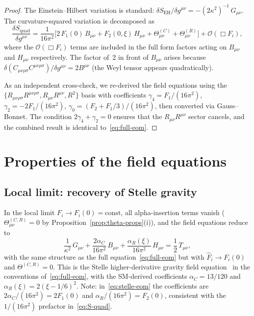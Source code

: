 \documentclass[12pt,a4paper]{article}
\newcommand{\Weylsq}{C_{\mu\nu\rho\sigma}C^{\mu\nu\rho\sigma}}
\newcommand{\Ricsq}{R_{\mu\nu}R^{\mu\nu}}
\newcommand{\Riemsq}{R_{\mu\nu\rho\sigma}R^{\mu\nu\rho\sigma}}
\newcommand{\order}{\mathcal{O}}
\theoremstyle{plain}
\theoremstyle{definition}
\begin{document}
\begin{proof}
The Einstein--Hilbert variation is standard:
$\delta S_{\mathrm{EH}}/\delta g^{\mu\nu}
= -(2\kappa^2)^{-1}\,G_{\mu\nu}$.
The curvature-squared variation is decomposed as
\begin{equation}\label{eq:var-decomp}
  \frac{\delta S_{\mathrm{quad}}}{\delta g^{\mu\nu}}
  = \frac{1}{16\pi^2}\bigl[2\,F_1(0)\,B_{\mu\nu}
    + F_2(0,\xi)\,H_{\mu\nu}
    + \Theta^{(C)}_{\mu\nu} + \Theta^{(R)}_{\mu\nu}\bigr]
    + \order(\Box F_i),
\end{equation}
where the $\order(\Box F_i)$ terms are included in the full form factors
acting on $B_{\mu\nu}$ and $H_{\mu\nu}$ respectively.  The factor of~2 in
front of $B_{\mu\nu}$ arises because $\delta(\Weylsq)/\delta g^{\mu\nu}
= 2B^{\mu\nu}$ (the Weyl tensor appears quadratically).

As an independent cross-check, we re-derived the field equations using the
$\{\Riemsq, \Ricsq, R^2\}$ basis with coefficients
$\gamma_4 = F_1/(16\pi^2)$, $\gamma_2 = -2F_1/(16\pi^2)$,
$\gamma_0 = (F_2 + F_1/3)/(16\pi^2)$, then converted via Gauss--Bonnet.
The condition $2\gamma_4 + \gamma_2 = 0$ ensures that the $\Ricsq$ sector
cancels, and the combined result is identical
to~\eqref{eq:full-eom}.
\end{proof}

\section{Properties of the field equations}
\label{sec:properties}

\subsection{Local limit: recovery of Stelle gravity}
\label{sec:local-limit}

In the local limit $F_i \to F_i(0) = \mathrm{const}$, all alpha-insertion
terms vanish ($\Theta^{(C,R)}_{\mu\nu} = 0$ by
Proposition~\ref{prop:theta-props}(i)), and the field equations reduce to
\begin{equation}\label{eq:stelle-eom}
  \frac{1}{\kappa^2}\,G_{\mu\nu}
  + \frac{2\alpha_C}{16\pi^2}\,B_{\mu\nu}
  + \frac{\alpha_R(\xi)}{16\pi^2}\,H_{\mu\nu}
  = \frac{1}{2}\,T_{\mu\nu},
\end{equation}
with the same structure as the full equation~\eqref{eq:full-eom}
but with $\hat{F}_i \to F_i(0)$ and $\Theta^{(C,R)} = 0$.
This is the Stelle higher-derivative gravity field
equation~\cite{Stelle:1978} in the conventions of~\eqref{eq:full-eom},
with the SM-derived coefficients
$\alpha_C = 13/120$ and $\alpha_R(\xi) = 2(\xi - 1/6)^2$.
Note: in~\eqref{eq:stelle-eom} the coefficients are
$2\alpha_C/(16\pi^2) = 2F_1(0)$ and $\alpha_R/(16\pi^2) = F_2(0)$,
consistent with the $1/(16\pi^2)$ prefactor in~\eqref{eq:S-quad}.
\end{document}

